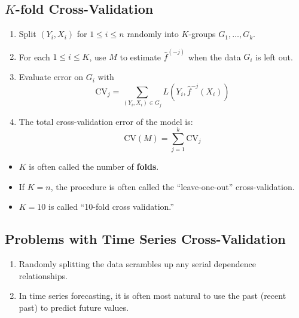\subsection*{$ K $-fold Cross-Validation}
\begin{enumerate}[(1)]
      \item Split $ (Y_i,X_i) $ for $ 1\le i\le n $ randomly into $ K $-groups
            $ G_1,\ldots,G_k $.
      \item For each $ 1\le i\le K $, use $ M $ to estimate $ \hat{f}^{(-j)} $
            when the data $ G_i $ is left out.
      \item Evaluate error on $ G_i $ with
            \[ \text{CV}_j=\sum_{(Y_i,X_i)\in G_j}L(Y_i,\hat{f}^{-j}(X_i))  \]
      \item The total cross-validation error of the model is:
            \[ \text{CV}(M)=\sum_{j=1}^{k} \text{CV}_j \]
\end{enumerate}
\begin{Remark}{}{}
      \begin{itemize}
            \item $ K $ is often called the number of \textbf{folds}.
            \item If $ K=n $, the procedure is often called the ``leave-one-out''
                  cross-validation.
            \item $ K=10 $ is called ``10-fold cross validation.''
      \end{itemize}
\end{Remark}
\subsection*{Problems with Time Series Cross-Validation}
\begin{enumerate}[(1)]
      \item Randomly splitting the data scrambles up any serial dependence relationships.
      \item In time series forecasting, it is often most natural to use
            the past (recent past) to predict future values.
\end{enumerate}
